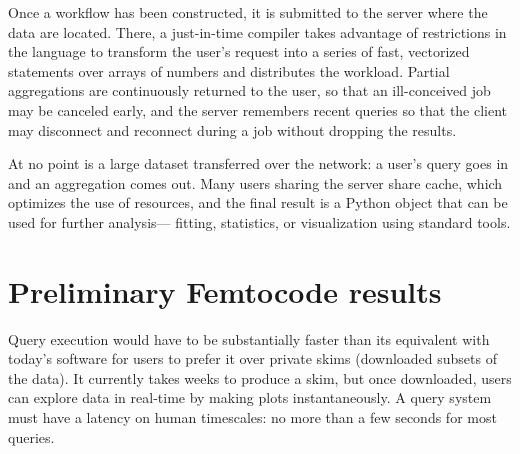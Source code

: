 \documentclass{article}
\begin{document}

Once a workflow has been constructed, it is submitted to the server where the data are located. There, a just-in-time compiler takes advantage of restrictions in the language to transform the user's request into a series of fast, vectorized statements over arrays of numbers and distributes the workload. Partial aggregations are continuously returned to the user, so that an ill-conceived job may be canceled early, and the server remembers recent queries so that the client may disconnect and reconnect during a job without dropping the results.

At no point is a large dataset transferred over the network: a user's query goes in and an aggregation comes out. Many users sharing the server share cache, which optimizes the use of resources, and the final result is a Python object that can be used for further analysis--- fitting, statistics, or visualization using standard tools.






\section{Preliminary Femtocode results}


Query execution would have to be substantially faster than its equivalent with today's software for users to prefer it over private skims (downloaded subsets of the data). It currently takes weeks to produce a skim, but once downloaded, users can explore data in real-time by making plots instantaneously. A query system must have a latency on human timescales: no more than a few seconds for most queries.
\end{document}
